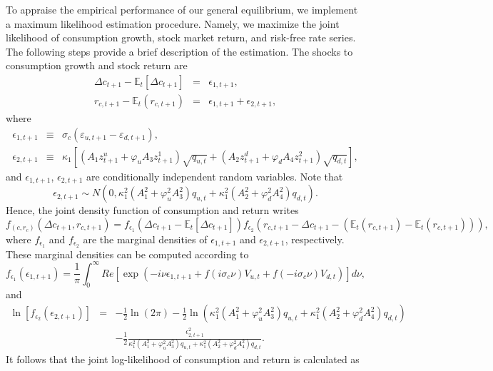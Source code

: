 \documentclass[11pt]{article}
\begin{document}
To appraise the empirical performance of our general equilibrium, we implement a maximum likelihood estimation procedure. Namely, we maximize the joint likelihood of consumption growth, stock market return, and risk-free rate series. The following steps provide a brief description of the estimation. The shocks to consumption growth and stock return are \begin{eqnarray*}
\Delta c_{t+1}-\mathbb{E}_{t}\left[ \Delta c_{t+1}\right] &=&\epsilon
_{1,t+1}, \\
r_{c,t+1}-\mathbb{E}_{t}(r_{c,t+1}) &=&\epsilon _{1,t+1}+\epsilon _{2,t+1},
\end{eqnarray*}where
\begin{eqnarray*}
\epsilon _{1,t+1} &\equiv &\sigma _{c}(\varepsilon _{u,t+1}-\varepsilon
_{d,t+1}), \\
\epsilon _{2,t+1} &\equiv &\kappa _{1}\left[ \left( A_{1}z_{t+1}^{u}+\varphi
_{u}A_{3}z_{t+1}^{1}\right) \sqrt{q_{u,t}}+\left( A_{2}z_{t+1}^{d}+\varphi
_{d}A_{4}z_{t+1}^{2}\right) \sqrt{q_{d,t}}\right],
\end{eqnarray*}and
$\epsilon _{1,t+1}$, $\epsilon _{2,t+1}$ are conditionally independent random variables. Note that%
\begin{equation*}
\epsilon _{2,t+1}\sim N\left( 0,\kappa _{1}^{2}\left( A_{1}^{2}+\varphi
_{u}^{2}A_{3}^{2}\right) q_{u,t}+\kappa _{1}^{2}\left( A_{2}^{2}+\varphi
_{d}^{2}A_{4}^{2}\right) q_{d,t}\right).
\end{equation*} Hence, the joint density function of consumption and return writes%
\begin{equation*}
f_{\left( c,r_{c}\right) }\left( \Delta c_{t+1},r_{c,t+1}\right)
=f_{\epsilon _{1}}\left( \Delta c_{t+1}-\mathbb{E}_{t}\left[ \Delta c_{t+1}%
\right] \right) f_{\epsilon _{2}}\left( r_{c,t+1}-\Delta c_{t+1}-\left(
\mathbb{E}_{t}(r_{c,t+1})-\mathbb{E}_{t}(r_{c,t+1})\right) \right),
\end{equation*} where $f_{\epsilon _{1}}$ and $f_{\epsilon _{2}}$ are the marginal densities
of $\epsilon _{1,t+1}$ and $\epsilon _{2,t+1}$, respectively. These marginal densities can be computed according to
\begin{equation*}
f_{\epsilon _{1}}\left( \epsilon _{1,t+1}\right) =\frac{1}{\pi }%
\int_{0}^{\infty }Re\left[ \exp \left( -i\nu \epsilon _{1,t+1}+f(i\sigma
_{c}\nu )V_{u,t}+f(-i\sigma _{c}\nu )V_{d,t}\right) \right] d\nu ,
\end{equation*} and%
\begin{eqnarray*}
\ln \left[ f_{\epsilon _{2}}\left( \epsilon _{2,t+1}\right) \right] &=&-%
\frac{1}{2}\ln \left( 2\pi \right) -\frac{1}{2}\ln \left( \kappa
_{1}^{2}\left( A_{1}^{2}+\varphi _{u}^{2}A_{3}^{2}\right) q_{u,t}+\kappa
_{1}^{2}\left( A_{2}^{2}+\varphi _{d}^{2}A_{4}^{2}\right) q_{d,t}\right) \\
&&-\frac{1}{2}\frac{\epsilon _{2,t+1}^{2}}{\kappa _{1}^{2}\left(
A_{1}^{2}+\varphi _{u}^{2}A_{3}^{2}\right) q_{u,t}+\kappa _{1}^{2}\left(
A_{2}^{2}+\varphi _{d}^{2}A_{4}^{2}\right) q_{d,t}}.
\end{eqnarray*} It follows that the joint log-likelihood of consumption and return is calculated as%
\end{document}
